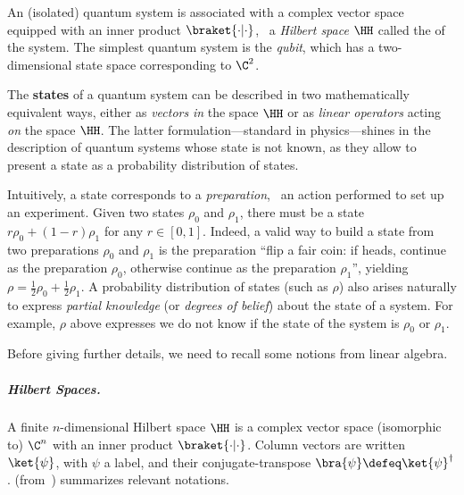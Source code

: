 An (isolated) quantum system is associated with a complex vector space equipped with an inner product $\braket{\cdot | \cdot}$, \ie\ a \emph{Hilbert space} $\HH$ called the  of the system.
The simplest quantum system is the \emph{qubit}, which has a two-dimensional state space corresponding to $\C^2$.

The \textbf{states} of a quantum system can be described in two mathematically equivalent ways, either as \emph{vectors} \emph{in} the space $\HH$ or as \emph{linear operators} acting \emph{on} the space $\HH$.
The latter formulation---standard in physics---shines in the description of quantum systems whose state is not known, as they allow to present a state as a probability distribution of states.

\begin{example}
\label{ex:preparation}
Intuitively, a state corresponds to a \emph{preparation}, \ie\ an action performed to set up an experiment.
Given two states $\rho_0$ and $\rho_1$, there must be a state $r\rho_0 + (1-r)\rho_1$ for any $r\in[0,1]$.
Indeed, a valid way to build a state from two preparations $\rho_0$ and $\rho_1$ is the preparation ``flip a fair coin: if heads, continue as the preparation $\rho_0$, otherwise continue as the preparation $\rho_1$'', yielding $\rho = \tfrac12\rho_0 + \tfrac12\rho_1$.
A probability distribution of states (such as $\rho$) also arises naturally to express \emph{partial knowledge} (or \emph{degrees of belief}) about the state of a system.
For example, $\rho$ above expresses we do not know if the state of the system is $\rho_0$ or $\rho_1$.
\end{example}

Before giving further details, we need to recall some notions from linear algebra.

\subparagraph{Hilbert Spaces.}

A finite $n$-dimensional Hilbert space $\HH$ is a complex vector space (isomorphic to) $\C^n$ with an inner product $\braket{\cdot |\cdot}$.
Column vectors are written $\ket{\psi}$, with $\psi$ a label, and their conjugate-transpose $\bra{\psi} \defeq \ket{\psi}^\dagger$. 	
 (from~\cite{Nielsen_book}) summarizes relevant notations.

